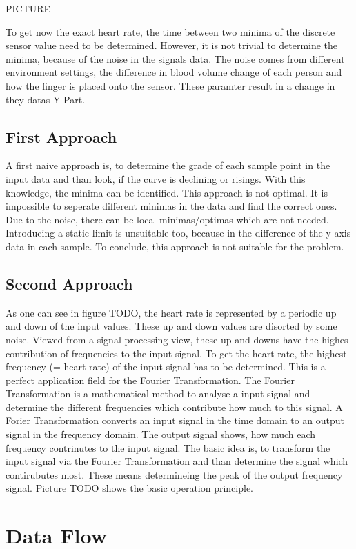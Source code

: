 \documentclass[oneside, notitlepage]{scrreprt}
\begin{document}
PICTURE

To get now the exact heart rate, the time between two minima of the discrete sensor value need to be determined. However, it is not trivial to determine
the minima, because of the noise in the signals data. The noise comes from different environment settings, the difference in blood volume change of each person and
how the finger is placed onto the sensor. These paramter result in a change in they datas Y Part.

\subsection{First Approach}
A first naive approach is, to determine the grade of each sample point in the input data and than look, if the curve is declining or risings.
With this knowledge, the minima can be identified. This approach is not optimal. It is impossible to seperate different minimas in the data and find the correct ones.
Due to the noise, there can be local minimas/optimas which are not needed. Introducing a static limit is unsuitable too, because in the difference of the y-axis data in each sample.
To conclude, this approach is not suitable for the problem.

\subsection{Second Approach}
As one can see in figure TODO, the heart rate is represented by a periodic up and down of the input values. These up and down values are disorted by some noise.
Viewed from a signal processing view, these up and downs have the highes contribution of frequencies to the input signal. To get the heart rate, the highest frequency (= heart rate)
of the input signal has to be determined. This is a perfect application field for the Fourier Transformation. The Fourier Transformation is a mathematical method to analyse a
input signal and determine the different frequencies which contribute how much to this signal. A Forier Transformation converts an input signal in the time domain to an output signal in the
frequency domain. The output signal shows, how much each frequency contrinutes to the input signal. The basic idea is, to transform the input signal via the Fourier Transformation and than
determine the signal which contirubutes most. These means determineing the peak of the output frequency signal. Picture TODO shows the basic operation principle.

\section{Data Flow}
\end{document}
